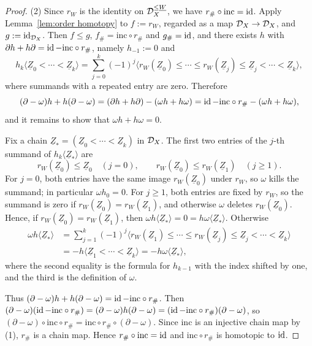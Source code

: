 \documentclass[a4paper,leqno]{amsart}
\begin{document}
{\begin{proof}
(2) Since $r_W$ is the identity on $\mathcal D_X^{\leq\underline{W}}$, we have $r_\#\circ\mathrm{inc}=\operatorname{id}$. Apply Lemma~\ref{lem:order homotopy} to $f:=r_W$, regarded as a map $\mathcal D_X\to\mathcal D_X$, and $g:=\operatorname{id}_{\mathcal D_X}$. Then $f\leq g$, $f_\#=\mathrm{inc}\circ r_\#$ and $g_\#=\operatorname{id}$, and there exists $h$ with $\partial h+h\partial=\operatorname{id}-\mathrm{inc}\circ r_\#$, namely $h_{-1}:=0$ and
\[
 h_k\langle\underline{Z}_0<\cdots<\underline{Z}_k\rangle
 =\sum_{j=0}^k(-1)^{j}
 \langle r_W(\underline{Z}_0)\leq\cdots\leq r_W(\underline{Z}_{j})\leq\underline{Z}_{j}<\cdots<\underline{Z}_k\rangle,
\]
where summands with a repeated entry are zero. Therefore
\[
 (\partial-\omega)h+h(\partial-\omega)=(\partial h+h\partial)-(\omega h+h\omega)=\operatorname{id}-\mathrm{inc}\circ r_\#-(\omega h+h\omega),
\]
and it remains to show that $\omega h+h\omega=0$.

Fix a chain $\underline{Z}_\ast=(\underline{Z}_0<\cdots<\underline{Z}_k)$ in $\mathcal D_X$. The first two entries of the $j$-th summand of $h_k\langle\underline{Z}_\ast\rangle$ are
\[
 r_W(\underline{Z}_0)\leq\underline{Z}_0\quad(j=0),
 \qquad
 r_W(\underline{Z}_0)\leq r_W(\underline{Z}_1)\quad(j\geq1).
\]
For $j=0$, both entries have the same image $r_W(\underline{Z}_0)$ under $r_W$, so $\omega$ kills the summand; in particular $\omega h_0=0$. For $j\geq1$, both entries are fixed by $r_W$, so the summand is zero if $r_W(\underline{Z}_0)=r_W(\underline{Z}_1)$, and otherwise $\omega$ deletes $r_W(\underline{Z}_0)$. Hence, if $r_W(\underline{Z}_0)=r_W(\underline{Z}_1)$, then $\omega h\langle\underline{Z}_\ast\rangle=0=h\omega\langle\underline{Z}_\ast\rangle$. Otherwise
\begin{align*}
 \omega h\langle\underline{Z}_\ast\rangle
 &=\sum_{j=1}^k(-1)^{j}
 \langle r_W(\underline{Z}_1)\leq\cdots\leq r_W(\underline{Z}_{j})\leq\underline{Z}_{j}<\cdots<\underline{Z}_k\rangle\\
 &=-h\langle\underline{Z}_1<\cdots<\underline{Z}_k\rangle
 =-h\omega\langle\underline{Z}_\ast\rangle,
\end{align*}
where the second equality is the formula for $h_{k-1}$ with the index shifted by one, and the third is the definition of $\omega$.

Thus $(\partial-\omega)h+h(\partial-\omega)=\operatorname{id}-\mathrm{inc}\circ r_\#$. Then $(\partial-\omega)(\operatorname{id}-\mathrm{inc}\circ r_\#)=(\partial-\omega)h(\partial-\omega)=(\operatorname{id}-\mathrm{inc}\circ r_\#)(\partial-\omega)$, so $(\partial-\omega)\circ\mathrm{inc}\circ r_\#=\mathrm{inc}\circ r_\#\circ(\partial-\omega)$. Since $\mathrm{inc}$ is an injective chain map by (1), $r_\#$ is a chain map. Hence $ r_\#\circ\mathrm{inc}=\operatorname{id}$ and $\mathrm{inc}\circ r_\#$ is homotopic to $\operatorname{id}$.


\end{proof}}
\end{document}
